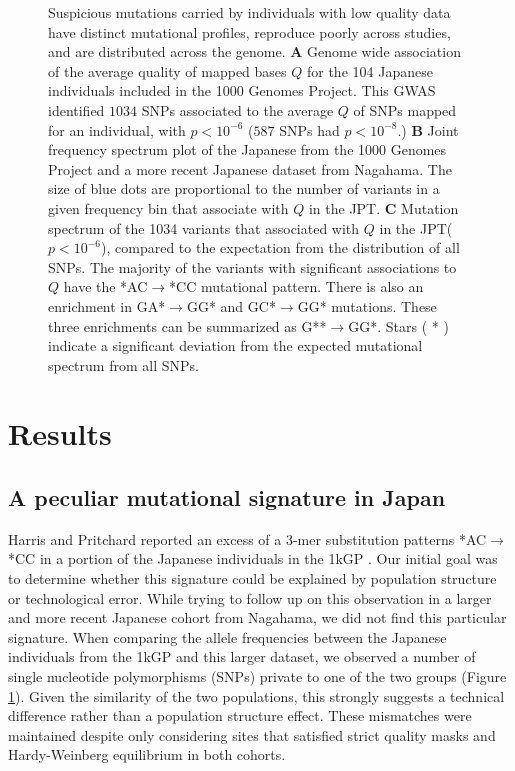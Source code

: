 \documentclass[9pt,lineno]{template}
\begin{document}
\begin{figure}
\caption{
Suspicious mutations carried by individuals with low quality data have distinct mutational profiles, reproduce poorly across studies, and are distributed across the genome.
\textbf{A} 
Genome wide association of the average quality of mapped bases $Q$ for the 104 Japanese individuals included in the 1000 Genomes Project. 
This GWAS identified $1034$ SNPs associated to the average $Q$ of SNPs mapped for an individual, with  $p < 10^{-6}$
($587$ SNPs had  $p < 10^{-8}.$)
\textbf{B} 
Joint frequency spectrum plot of the Japanese from the 1000 Genomes Project and a more recent Japanese dataset from Nagahama.
The size of blue dots are proportional to the number of variants in a given frequency bin that associate with $Q$ in the JPT. 
\textbf{C} 
Mutation spectrum of the 1034 variants that associated with $Q$ in the JPT($p < 10^{-6}$), compared to the expectation from the distribution of all SNPs.
The majority of the variants with significant associations to $Q$ have the *AC${\rightarrow}$*CC mutational pattern. 
There is also an enrichment in GA*${\rightarrow}$GG* and GC*${\rightarrow}$GG* mutations. 
These three enrichments can be summarized as G**${\rightarrow}$GG*. 
Stars ( * ) indicate a significant deviation from the expected mutational spectrum from all SNPs.
}
 \label{SFS}
\end{figure}


\section{Results}

			
\subsection{A peculiar mutational signature in Japan}			
	
Harris and Pritchard reported an excess of a 3-mer substitution patterns *AC${\rightarrow}$*CC in a portion of the Japanese individuals in the 1kGP \citep{Harris2017a}.
Our initial goal was to determine whether this signature could be explained by population structure or technological error.
While trying to follow up on this observation in a larger and more recent Japanese cohort from Nagahama, we did not find this particular signature.
When comparing the allele frequencies between the Japanese individuals from the 1kGP and this larger dataset, we observed a number of single nucleotide polymorphisms (SNPs) private to one of the two groups (Figure \ref{SFS}).
Given the similarity of the two populations, this strongly suggests a technical difference rather than a population structure effect.
These mismatches were maintained despite only considering sites that satisfied strict quality masks and Hardy-Weinberg equilibrium in both cohorts.
\end{document}
